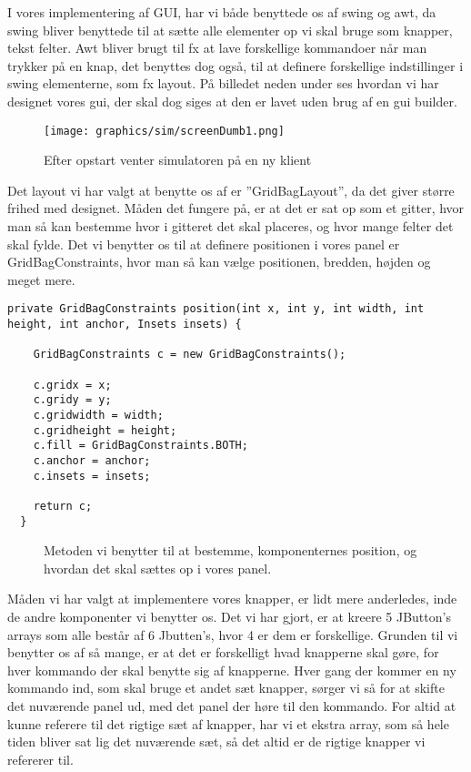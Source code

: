 \documentclass[a4paper]{article}
\newenvironment{changemargin}[2]{%
\begin{list}{}{%
\setlength{\topsep}{0pt}%
\setlength{\leftmargin}{#1}%
\setlength{\rightmargin}{#2}%
\setlength{\listparindent}{\parindent}%
\setlength{\itemindent}{\parindent}%
\setlength{\parsep}{\parskip}%
}%
\item[]}{\end{list}}
\begin{document}
I vores implementering af GUI, har vi både benyttede os af swing og awt, da swing bliver benyttede til at sætte alle elementer op vi skal bruge som knapper, tekst felter. Awt bliver brugt til fx at lave forskellige kommandoer når man trykker på en knap, det benyttes dog også, til at definere forskellige indstillinger i swing elementerne, som fx layout. På billedet neden under ses hvordan vi har designet vores gui, der skal dog siges at den er lavet uden brug af en gui builder.

\begin{figure}[H]
\begin{changemargin}{-1.3cm}{}
  \centering
  \texttt{[image: graphics/sim/screenDumb1.png]}
  \caption{Efter opstart venter simulatoren på en ny klient}
\end{changemargin}
\end{figure}

Det layout vi har valgt at benytte os af er ”GridBagLayout”, da det giver større frihed med designet. Måden det fungere på, er at det er sat op som et gitter, hvor man så kan bestemme hvor i gitteret det skal placeres, og hvor mange felter det skal fylde. Det vi benytter os til at definere positionen i vores panel er GridBagConstraints, hvor man så kan vælge positionen, bredden, højden og meget mere.

\begin{lstlisting}
private GridBagConstraints position(int x, int y, int width, int height, int anchor, Insets insets) {

    GridBagConstraints c = new GridBagConstraints();

    c.gridx = x;
    c.gridy = y;
    c.gridwidth = width;
    c.gridheight = height;
    c.fill = GridBagConstraints.BOTH;
    c.anchor = anchor;
    c.insets = insets;
    
    return c;
  } 
\end{lstlisting}
\begin{figure}[h!]
  \caption{Metoden vi benytter til at bestemme, komponenternes position, og hvordan det skal sættes op i vores panel.}
\end{figure}

Måden vi har valgt at implementere vores knapper, er lidt mere anderledes, inde de andre komponenter vi benytter os. Det vi har gjort, er at kreere 5 JButton’s arrays som alle består af 6 Jbutten’s, hvor 4 er dem er forskellige. Grunden til vi benytter os af så mange, er at det er forskelligt hvad knapperne skal gøre, for hver kommando der skal benytte sig af knapperne. Hver gang der kommer en ny kommando ind, som skal bruge et andet sæt knapper, sørger vi så for at skifte det nuværende panel ud, med det panel der høre til den kommando. For altid at kunne referere til det rigtige sæt af knapper, har vi et ekstra array, som så hele tiden bliver sat lig det nuværende sæt, så det altid er de rigtige knapper vi refererer til.
\end{document}
